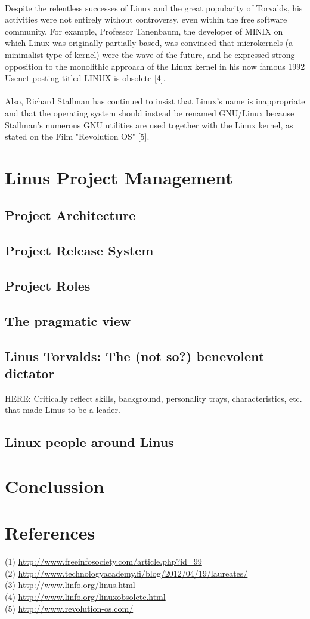 \documentclass[11pt]{article}
\begin{document}
\\
Despite the relentless successes of Linux and the great popularity of Torvalds, his activities were not entirely without controversy, even within the free software community. For example, Professor Tanenbaum, the developer of MINIX on which Linux was originally partially based, was convinced that microkernels (a minimalist type of kernel) were the wave of the future, and he expressed strong opposition to the monolithic approach of the Linux kernel in his now famous 1992 Usenet posting titled LINUX is obsolete [4].\\
\\
Also, Richard Stallman has continued to insist that Linux's name is inappropriate and that the operating system should instead be renamed GNU/Linux because Stallman's numerous GNU utilities are used together with the Linux kernel, as stated on the Film "Revolution OS" [5].
\section{Linus Project Management}
\subsection{Project Architecture}
\subsection{Project Release System}
\subsection{Project Roles}
\subsection{The pragmatic view}
\subsection{Linus Torvalds: The (not so?) benevolent dictator}
HERE: Critically reflect skills, background, personality trays, characteristics, etc. that made Linus to be a leader.
\subsection{Linux people around Linus}

\section{Conclussion}

\section{References}
(1) \url{http://www.freeinfosociety.com/article.php?id=99}
\\
(2) \url{http://www.technologyacademy.fi/blog/2012/04/19/laureates/}
\\
(3) \url{http://www.linfo.org/linus.html}
\\
(4) \url{http://www.linfo.org/linuxobsolete.html}
\\
(5) \url{http://www.revolution-os.com/}
\end{document}
